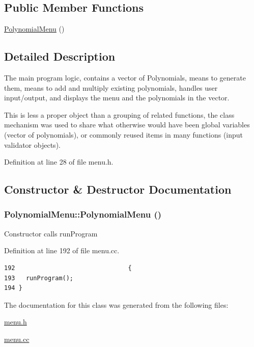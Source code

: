 \subsection*{Public Member Functions}
\begin{CompactItemize}
\item 
\hyperlink{classPolynomialMenu_bcc711635d8721ea6803a73a706ff47e}{PolynomialMenu} ()
\end{CompactItemize}


\subsection{Detailed Description}
The main program logic, contains a vector of Polynomials, means to generate them, means to add and multiply existing polynomials, handles user input/output, and displays the menu and the polynomials in the vector. 

This is less a proper object than a grouping of related functions, the class mechanism was used to share what otherwise would have been global variables (vector of polynomials), or commonly reused items in many functions (input validator objects). 

Definition at line 28 of file menu.h.

\subsection{Constructor \& Destructor Documentation}
\hypertarget{classPolynomialMenu_bcc711635d8721ea6803a73a706ff47e}{
\subsubsection[PolynomialMenu]{\setlength{\rightskip}{0pt plus 5cm}PolynomialMenu::PolynomialMenu ()}}
\label{classPolynomialMenu_bcc711635d8721ea6803a73a706ff47e}


Constructor calls runProgram 

Definition at line 192 of file menu.cc.

\begin{Code}\begin{verbatim}192                               {
193   runProgram();
194 }
\end{verbatim}
\end{Code}




The documentation for this class was generated from the following files:\begin{CompactItemize}
\item 
\hyperlink{menu_8h}{menu.h}\item 
\hyperlink{menu_8cc}{menu.cc}\end{CompactItemize}
